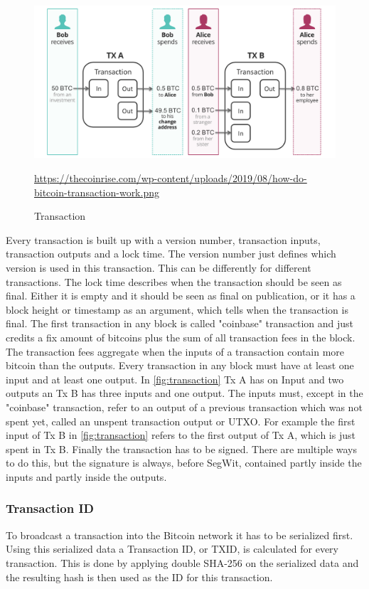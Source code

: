 \begin{figure}[!ht]
    \centering
    \includegraphics[width=\textwidth]{Ausarbeitung/images/transaction.png} \caption[Transaction]{Transaction}
    \small \url{https://thecoinrise.com/wp-content/uploads/2019/08/how-do-bitcoin-transaction-work.png}
    \label{fig:transaction}
\end{figure}
Every transaction is built up with a version number, transaction inputs, transaction outputs and a lock time.
The version number just defines which version is used in this transaction. This can be differently for different transactions.
The lock time describes when the transaction should be seen as final. Either it is empty and it should be seen as final on publication, or it has a block height or timestamp as an argument, which tells when the transaction is final.
The first transaction in any block is called "coinbase" transaction and just credits a fix amount of bitcoins plus the sum of all transaction fees in the block. The transaction fees aggregate when the inputs of a transaction contain more bitcoin than the outputs.
Every transaction in any block must have at least one input and at least one output. In \autoref{fig:transaction} Tx A has on Input and two outputs an Tx B has three inputs and one output. The inputs must, except in the "coinbase" transaction, refer to an output of a previous transaction which was not spent yet, called an unspent transaction output or UTXO. For example the first input of Tx B in \autoref{fig:transaction} refers to the first output of Tx A, which is just spent in Tx B.
Finally the transaction has to be signed. There are multiple ways to do this, but the signature is always, before SegWit, contained partly inside the inputs and partly inside the outputs.

\subsubsection{Transaction ID}
To broadcast a transaction into the Bitcoin network it has to be serialized first. Using this serialized data a Transaction ID, or TXID, is calculated for every transaction. This is done by applying double SHA-256 on the serialized data and the resulting hash is then used as the ID for this transaction.


